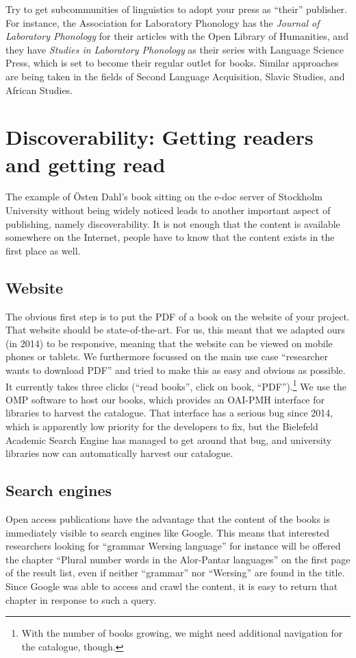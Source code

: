 \documentclass[nonflat,smallfont
]{langsci/langscibook}
\begin{document}
Try to get subcommunities of linguistics to adopt your press as ``their'' publisher. For instance, the {Association for Laboratory Phonology} has the \textit{Journal of Laboratory Phonology} for their articles with the Open Library of Humanities, and they have \textit{Studies in Laboratory Phonology} as their series with Language Science Press, which is set to become their regular outlet for books. Similar approaches are being taken in the fields of Second Language Acquisition, Slavic Studies, and African Studies. 

\section{Discoverability: Getting readers and getting read}\label{sec:discoverability} 
The example of Östen Dahl's book sitting on the e-doc server of Stockholm University without being widely noticed leads to another important aspect of publishing, namely discoverability. It is not enough that the content is available somewhere on the Internet, people have to know that the content exists in the first place as well. 

\subsection{Website}
The obvious first step is to put the PDF of a book on the website of your project. That website should be state-of-the-art. For us, this meant that we adapted ours (in 2014) to be responsive, meaning that the website can be viewed on mobile phones or tablets. We furthermore focussed on the main use case ``researcher wants to download PDF'' and tried to make this as easy and obvious as possible. It currently takes three clicks (``read books'', click on book, ``PDF'').\footnote{With the number of books growing, we might need additional navigation for the catalogue, though.} We use the OMP software to host our books, which provides an OAI-PMH interface for libraries to harvest the catalogue. That interface has a serious bug since 2014, which is apparently low priority for the developers to fix, but the Bielefeld Academic Search Engine has managed to get around that bug, and university libraries now can automatically harvest our catalogue.

\subsection{Search engines}
Open access publications have the advantage that the content of the books is immediately visible to search engines like Google. This means that interested researchers looking for ``grammar Wersing language'' for instance will be offered the chapter ``Plural number words in the Alor-Pantar languages'' on the first page of the result list, even if neither ``grammar'' nor ``Wersing'' are found in the title. Since Google was able to access and crawl the content, it is easy to return that chapter in response to such a query. 
\end{document}
